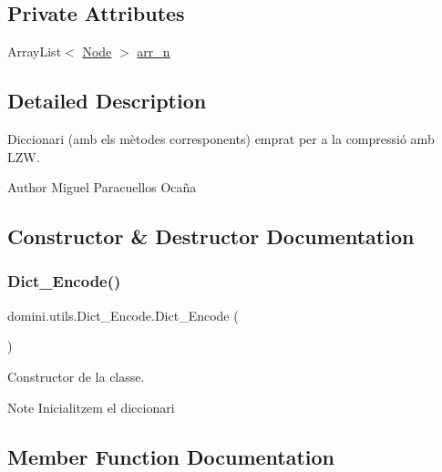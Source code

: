\subsection*{Private Attributes}
\begin{DoxyCompactItemize}
\item 
Array\+List$<$ \hyperlink{classdomini_1_1utils_1_1Node}{Node} $>$ \hyperlink{classdomini_1_1utils_1_1Dict__Encode_abc506ae01222e16d9b6581efbdad1a97}{arr\+\_\+n}
\end{DoxyCompactItemize}


\subsection{Detailed Description}
Diccionari (amb els mètodes corresponents) emprat per a la compressió amb L\+ZW. 

\begin{DoxyAuthor}{Author}
Miguel Paracuellos Ocaña 
\end{DoxyAuthor}


\subsection{Constructor \& Destructor Documentation}
\mbox{\label{classdomini_1_1utils_1_1Dict__Encode_aa16372a031311494fdcae13d1a9b48c3}} 
\subsubsection{\texorpdfstring{Dict\+\_\+\+Encode()}{Dict\_Encode()}}
{\footnotesize\ttfamily domini.\+utils.\+Dict\+\_\+\+Encode.\+Dict\+\_\+\+Encode (\begin{DoxyParamCaption}{ }\end{DoxyParamCaption})\hspace{0.3cm}{\ttfamily [inline]}}



Constructor de la classe. 

\begin{DoxyNote}{Note}
Inicialitzem el diccionari 
\end{DoxyNote}


\subsection{Member Function Documentation}
\mbox{\label{classdomini_1_1utils_1_1Dict__Encode_a12e23ecdd9b0078cb6e56c01126248b9}} 
